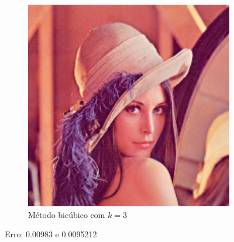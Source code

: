 \documentclass[leqno]{article}
\begin{document}
\begin{figure}[H]
\begin{subfigure}{.33\textwidth}
        \includegraphics[width=.7\linewidth]{../images/lena_bic.png}
        \caption{Método bicúbico com $k = 3$}
        \label{fig:sub1}
      \end{subfigure}%
    \caption{Erro: 0.00983 e 0.0095212}
    \label{fig:test}
\end{figure}
\end{document}
